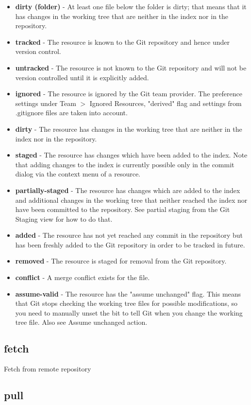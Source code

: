 \documentclass{scrreprt}
\newcommand{\layerThree}[1]{\subsection{#1}}
\begin{document}
\begin{itemize}
  \item \textbf{dirty (folder)} - At least one file below the folder is dirty; that
  means that it has changes in the working tree that are neither in the index nor in the repository.
  \item \textbf{tracked} - The resource is known to the Git repository and hence
  under version control.
  \item \textbf{untracked} - The resource is not known to the Git repository
  and will not be version controlled until it is explicitly added.
  \item \textbf{ignored} - The resource is ignored by the Git team provider. The
  preference settings under Team $>$ Ignored Resources, "derived" flag and
  settings from .gitignore files are taken into account.
  \item \textbf{dirty} - The resource has changes in the working tree that are
  neither in the index nor in the repository.
  \item \textbf{staged} - The resource has changes which have been added to the
  index. Note that adding changes to the index is currently possible only in the commit dialog via the context menu of a resource.
  \item \textbf{partially-staged} - The resource has changes which are added to the
  index and additional changes in the working tree that neither reached the index nor have been committed to the repository. See partial staging from the Git Staging view for how to do that.
  \item \textbf{added} - The resource has not yet reached any commit in the
  repository but has been freshly added to the Git repository in order to be tracked in future.
  \item \textbf{removed} - The resource is staged for removal from the Git
  repository.
  \item \textbf{conflict} - A merge conflict exists for the file.
  \item \textbf{assume-valid} - The resource has the "assume unchanged" flag. This
  means that Git stops checking the working tree files for possible modifications, so you need to manually unset the bit to tell Git when you change the working tree file. Also see Assume unchanged action.
\end{itemize}

\layerThree{fetch}

Fetch from remote repository

\layerThree{pull}
\end{document}
